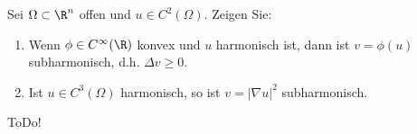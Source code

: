
\begin{exercise}

Sei $\Omega \subset \R^n$ offen und $u \in C^2(\Omega)$.
Zeigen Sie:

\begin{enumerate}[label = (\roman*)]
    \item Wenn $\phi \in C^\infty(\R)$ konvex und $u$ harmonisch ist, dann ist $v = \phi(u)$ subharmonisch, d.h. $\Delta v \geq 0$.
    \item Ist $u \in C^3(\Omega)$ harmonisch, so ist $v = |\nabla u|^2$ subharmonisch.
\end{enumerate}

\end{exercise}


\begin{solution}

ToDo!

\end{solution}

